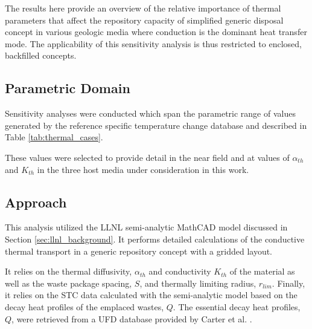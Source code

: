 
The results here provide an overview of the relative importance of thermal
parameters that affect the repository capacity of simplified generic
disposal concept in various geologic media where conduction is the dominant
heat transfer mode. The applicability of this sensitivity analysis is thus
restricted to enclosed, backfilled concepts.  

\subsection{Parametric Domain}

Sensitivity analyses were conducted which span the parametric range of values 
generated by the reference specific temperature change database and described 
in Table \ref{tab:thermal_cases}.  



These values were selected to provide detail in the near field and at values of
$\alpha_{th}$ and $K_{th}$ in the three host media under consideration in this
work.

\subsection{Approach}

This analysis utilized the \gls{LLNL} semi-analytic MathCAD model
discussed in Section \ref{sec:llnl_background}.  It performs detailed
calculations of the conductive thermal transport in a generic repository
concept with a gridded layout.  

It relies on the thermal diffusivity, $\alpha_{th}$ and conductivity $K_{th}$ of 
the material as well as the waste package spacing, $S$, and thermally limiting 
radius, $r_{lim}$. Finally, it relies on the \gls{STC} data calculated with the 
semi-analytic model based on the decay heat profiles of the emplaced wastes, $Q$. 
The essential decay heat profiles, $Q$, were retrieved from a \gls{UFD} database 
provided by Carter et al. \cite{carter_fuel_2011}.


